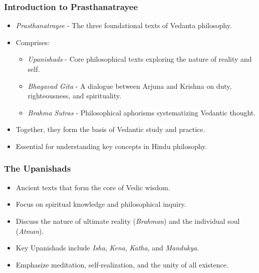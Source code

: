 \begin{frame}[fragile]\frametitle{Introduction to Prasthanatrayee}

      \begin{itemize}
		\item \textit{Prasthanatrayee} - The three foundational texts of Vedanta philosophy.
		\item Comprises:
		  \begin{itemize}
		      \item \textit{Upanishads} - Core philosophical texts exploring the nature of reality and self.
		      \item \textit{Bhagavad Gita} - A dialogue between Arjuna and Krishna on duty, righteousness, and spirituality.
		      \item \textit{Brahma Sutras} - Philosophical aphorisms systematizing Vedantic thought.
		  \end{itemize}
		\item Together, they form the basis of Vedantic study and practice.
		\item Essential for understanding key concepts in Hindu philosophy.
	  \end{itemize}

\end{frame}

\begin{frame}[fragile]\frametitle{The Upanishads}

      \begin{itemize}
		\item Ancient texts that form the core of Vedic wisdom.
		\item Focus on spiritual knowledge and philosophical inquiry.
		\item Discuss the nature of ultimate reality (\textit{Brahman}) and the individual soul (\textit{Atman}).
		\item Key Upanishads include \textit{Isha}, \textit{Kena}, \textit{Katha}, and \textit{Mandukya}.
		\item Emphasize meditation, self-realization, and the unity of all existence.
	  \end{itemize}

\end{frame}

